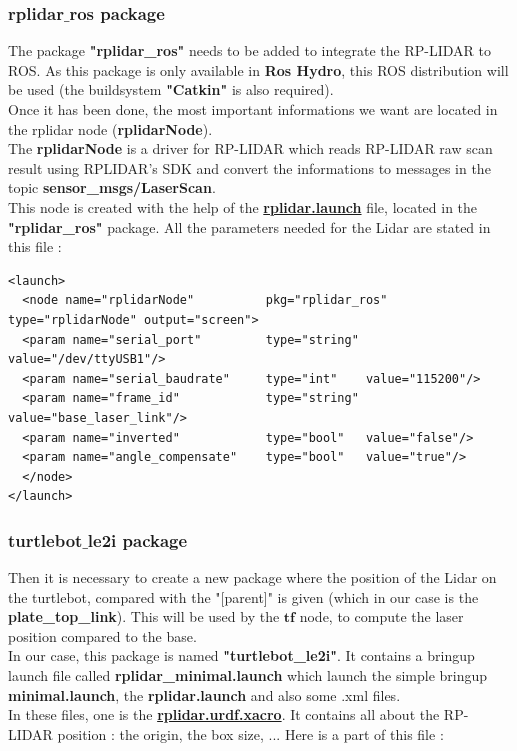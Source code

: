 \documentclass[10pt,a4paper]{article}
\begin{document}
\subsubsection{rplidar$\_$ros package}
The package \textbf{"rplidar\_ros"} needs to be added to integrate the RP-LIDAR to ROS. 
As this package is only available in \textbf{Ros Hydro}, this ROS distribution will be used (the buildsystem \textbf{"Catkin"} is also required).\\
Once it has been done, the most important informations we want are located in the rplidar node (\textbf{rplidarNode}).\\
The \textbf{rplidarNode} is a driver for RP-LIDAR which reads RP-LIDAR raw scan result using RPLIDAR's SDK and convert the informations to messages in the topic \textbf{sensor\_msgs/LaserScan}.\\

This node is created with the help of the \textbf{\underline{rplidar.launch}} file, located in the \textbf{"rplidar\_ros"} package.
All the parameters needed for the Lidar are stated in this file : \\

\begin{lstlisting}[frame=single] 
<launch>
  <node name="rplidarNode"          pkg="rplidar_ros"  type="rplidarNode" output="screen">
  <param name="serial_port"         type="string" value="/dev/ttyUSB1"/>  
  <param name="serial_baudrate"     type="int"    value="115200"/>
  <param name="frame_id"            type="string" value="base_laser_link"/>
  <param name="inverted"            type="bool"   value="false"/>
  <param name="angle_compensate"    type="bool"   value="true"/>
  </node>
</launch>
\end{lstlisting}


\subsubsection{turtlebot$\_$le2i package}


Then it is necessary to create a new package where the position of the Lidar on the turtlebot, compared with the "[parent]" is given (which in our case is the \textbf{plate\_top\_link}). This will be used by the  $\textbf{tf}$ node, to compute the laser position compared to the base. \\
In our case, this package is named \textbf{"turtlebot\_le2i"}. It contains a bringup launch file called \textbf{rplidar\_minimal.launch} which launch the simple bringup \textbf{minimal.launch}, the \textbf{rplidar.launch} and also some .xml files. \\
In these files, one is the \textbf{\underline{rplidar.urdf.xacro}}.
It contains all about the RP-LIDAR position : the origin, the box size, ...  Here is a part of this file : 
\end{document}
